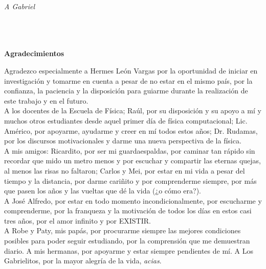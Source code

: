 \newpage{\pagestyle{empty}\cleardoublepage}

\newpage %
\thispagestyle{empty} \textbf{}\normalsize
\begin{flushright}
\vfill
\textit{A Gabriel}
\vfill

\end{flushright}

\newpage{\pagestyle{empty}\cleardoublepage}

\newpage %
\thispagestyle{empty} \textbf{}\normalsize
\\\\\\%
\textbf{\LARGE Agradecimientos} \\
\vfill

Agradezco especialmente a Hermes Le\'on Vargas por la oportunidad de iniciar en investigaci\'on y tomarme en cuenta a pesar de no estar en el mismo pa\'is, por la confianza, la paciencia y la disposici\'on para guiarme durante la realizaci\'on de este trabajo y en el futuro. \\

A los docentes de la Escuela de F\'isica; Ra\'ul, por su disposici\'on y su apoyo a m\'i y muchos otros estudiantes desde aquel primer d\'ia de f\'isica computacional; Lic. Am\'erico, por apoyarme, ayudarme y creer en m\'i todos estos a\~{n}os; Dr. Rudamas, por los discursos motivacionales y darme una nueva perspectiva de la f\'isica. \\

A mis amigos: Ricardito, por ser mi guardaespaldas, por caminar tan r\'apido sin recordar que mido un metro menos y por escuchar y compartir las eternas quejas, al menos las risas no faltaron; Carlos y Mei, por estar en mi vida a pesar del tiempo y la distancia, por darme cari\~{n}ito y por comprenderme siempre, por m\'as que pasen los a\~{n}os y las vueltas que d\'e la vida (¿o c\'omo era?). \\

A José Alfredo, por estar en todo momento incondicionalmente, por escucharme y comprenderme, por la franqueza y la motivaci\'on de todos los d\'ias en estos casi tres a\~{n}os, por el amor infinito y por EXISTIR. \\

A Robe y Paty, mis papás, por procurarme siempre las mejores condiciones posibles para poder seguir estudiando, por la comprensión que me demuestran diario. A mis hermanas, por apoyarme y estar siempre pendientes de mí. A Los Gabrielitos, por la mayor alegría de la vida, \textit{acias}. \\
\vfill

\newpage{\pagestyle{empty}\cleardoublepage}
